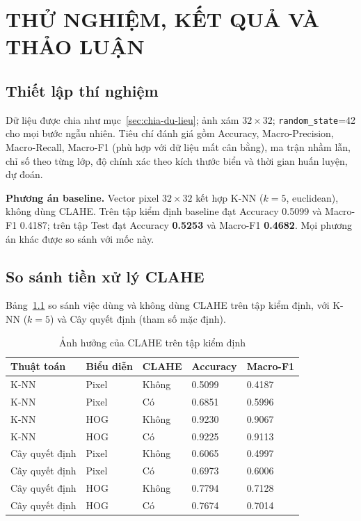 \chapter{THỬ NGHIỆM, KẾT QUẢ VÀ THẢO LUẬN}

\section{Thiết lập thí nghiệm}

Dữ liệu được chia như mục~\ref{sec:chia-du-lieu}; ảnh xám $32\times32$; \texttt{random\_state}=42 cho mọi bước ngẫu nhiên. Tiêu chí đánh giá gồm Accuracy, Macro-Precision, Macro-Recall, Macro-F1 (phù hợp với dữ liệu mất cân bằng), ma trận nhầm lẫn, chỉ số theo từng lớp, độ chính xác theo kích thước biển và thời gian huấn luyện, dự đoán.

\textbf{Phương án baseline.} Vector pixel $32\times32$ kết hợp K-NN ($k=5$, euclidean), không dùng CLAHE. Trên tập kiểm định baseline đạt Accuracy 0.5099 và Macro-F1 0.4187; trên tập Test đạt Accuracy \textbf{0.5253} và Macro-F1 \textbf{0.4682}. Mọi phương án khác được so sánh với mốc này.

\section{So sánh tiền xử lý CLAHE}
\label{sec:so-sanh-clahe}

Bảng~\ref{tab:clahe} so sánh việc dùng và không dùng CLAHE trên tập kiểm định, với K-NN ($k=5$) và Cây quyết định (tham số mặc định).

\begin{table}[H]
\centering
\caption{Ảnh hưởng của CLAHE trên tập kiểm định}
\label{tab:clahe}
\begin{tabular}{|p{3.6cm}|p{2.6cm}|p{2.2cm}|p{2.6cm}|p{2.6cm}|}
\hline
\textbf{Thuật toán} & \textbf{Biểu diễn} & \textbf{CLAHE} & \textbf{Accuracy} & \textbf{Macro-F1} \\
\hline
K-NN & Pixel & Không & 0.5099 & 0.4187 \\
\hline
K-NN & Pixel & Có & 0.6851 & 0.5996 \\
\hline
K-NN & HOG & Không & 0.9230 & 0.9067 \\
\hline
K-NN & HOG & Có & 0.9225 & 0.9113 \\
\hline
Cây quyết định & Pixel & Không & 0.6065 & 0.4997 \\
\hline
Cây quyết định & Pixel & Có & 0.6973 & 0.6006 \\
\hline
Cây quyết định & HOG & Không & 0.7794 & 0.7128 \\
\hline
Cây quyết định & HOG & Có & 0.7674 & 0.7014 \\
\hline
\end{tabular}
\end{table}

